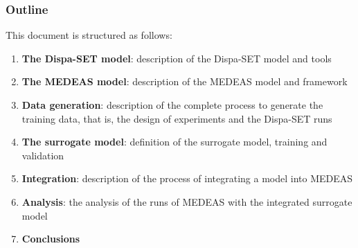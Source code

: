 \subsubsection{Outline}

This document is structured as follows:

\begin{enumerate}
    \item \textbf{The Dispa-SET model}: description of the Dispa-SET model and tools
    \item \textbf{The MEDEAS model}: description of the MEDEAS model and framework
    \item \textbf{Data generation}: description of the complete process to generate the training data, that is, the design of experiments and the Dispa-SET runs
    \item \textbf{The surrogate model}: definition of the surrogate model, training and validation
    \item \textbf{Integration}: description of the process of integrating a model into MEDEAS
    \item \textbf{Analysis}: the analysis of the runs of MEDEAS with the integrated surrogate model
    \item \textbf{Conclusions}
\end{enumerate}
